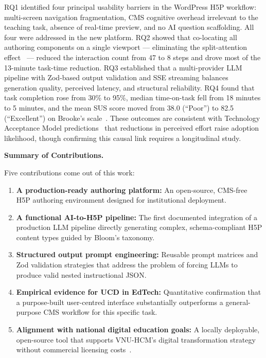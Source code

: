 RQ1 identified four principal usability barriers in the WordPress H5P workflow: multi-screen navigation fragmentation, CMS cognitive overhead irrelevant to the teaching task, absence of real-time preview, and no AI question scaffolding. All four were addressed in the new platform. RQ2 showed that co-locating all authoring components on a single viewport --- eliminating the split-attention effect~\cite{chandler1991} --- reduced the interaction count from 47 to 8 steps and drove most of the 13-minute task-time reduction. RQ3 established that a multi-provider LLM pipeline with Zod-based output validation and SSE streaming balances generation quality, perceived latency, and structural reliability. RQ4 found that task completion rose from 30\% to 95\%, median time-on-task fell from 18 minutes to 5 minutes, and the mean SUS score moved from 38.0 (``Poor'') to 82.5 (``Excellent'') on Brooke's scale~\cite{brooke1996}. These outcomes are consistent with Technology Acceptance Model predictions~\cite{davis1989} that reductions in perceived effort raise adoption likelihood, though confirming this causal link requires a longitudinal study.

\textbf{Summary of Contributions.}

Five contributions come out of this work:

\begin{enumerate}
  \item \textbf{A production-ready authoring platform:} An open-source, CMS-free H5P authoring environment designed for institutional deployment.
  \item \textbf{A functional AI-to-H5P pipeline:} The first documented integration of a production LLM pipeline directly generating complex, schema-compliant H5P content types guided by Bloom's taxonomy.
  \item \textbf{Structured output prompt engineering:} Reusable prompt matrices and Zod validation strategies that address the problem of forcing LLMs to produce valid nested instructional JSON.
  \item \textbf{Empirical evidence for UCD in EdTech:} Quantitative confirmation that a purpose-built user-centred interface substantially outperforms a general-purpose CMS workflow for this specific task.
  \item \textbf{Alignment with national digital education goals:} A locally deployable, open-source tool that supports VNU-HCM's digital transformation strategy without commercial licensing costs~\cite{vietnam_strategy2021}.
\end{enumerate}

